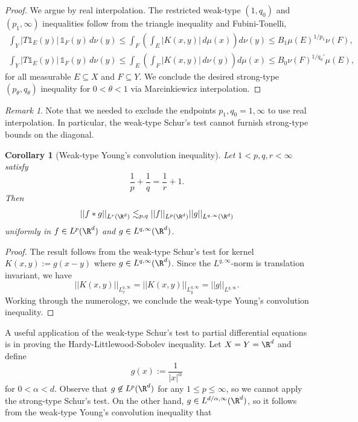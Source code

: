 \documentclass[reqno]{amsart}
\newtheorem{corollary}[theorem]{Corollary}
\theoremstyle{definition}
\theoremstyle{remark}
\newtheorem*{remark}{Remark}
\begin{document}
\begin{proof}
	We argue by real interpolation. The restricted weak-type $(1, q_0)$ and $(p_1, \infty)$ inequalities follow from the triangle inequality and Fubini-Tonelli, 
		\begin{align*}
			 \int_Y |T\mathbb 1_E (y)| \, \mathbb 1_F (y) \, d \nu(y) 
			 	\leq \int_F \left(\int_E |K(x, y)| \, d\mu(x) \right) d \nu(y) \leq B_1 \mu(E)^{1/p_1} \nu(F), \\
			  \int_Y |T\mathbb 1_E (y)| \, \mathbb 1_F (y) \, d \nu(y) 
			 	\leq  \int_E \left(\int_F |K(x, y)| \, d \nu(y) \right) d\mu(x)  \leq B_0 \nu(F)^{1/q_0'} \mu(E),
		\end{align*}	 
	for all measurable $E \subseteq X$ and $F \subseteq Y$. We conclude the desired strong-type $(p_\theta, q_\theta)$ inequality for $0 < \theta < 1$ via Marcinkiewicz interpolation. 	
\end{proof}

\begin{remark}
	Note that we needed to exclude the endpoints $p_1, q_0 = 1, \infty$ to use real interpolation. In particular, the weak-type Schur's test cannot furnish strong-type bounds on the diagonal. 
\end{remark}

\begin{corollary}[Weak-type Young's convolution inequality]
	Let $1 < p, q, r < \infty$ satisfy
		\[ \frac1p + \frac1q = \frac1r + 1. \]
	Then 
		\[ ||f * g||_{L^r (\R^d)} \lesssim_{p, q} ||f||_{L^p (\R^d)} ||g||_{L^{q, \infty} (\R^d)} \]	
	uniformly in $f \in L^p (\R^d)$ and $g \in L^{q, \infty} (\R^d)$.
\end{corollary}

\begin{proof}
	The result follows from the weak-type Schur's test for kernel $K(x, y) := g(x - y)$ where $g \in L^{q, \infty} (\R^d)$. Since the $L^{q, \infty}$-norm is translation invariant, we have 
		\[ ||K(x, y)||_{L^{q, \infty}_x} = ||K(x, y)||_{L^{q, \infty}_y} = ||g||_{L^{q, \infty}}. \]
	Working through the numerology, we conclude the weak-type Young's convolution inequality.	
\end{proof}

A useful application of the weak-type Schur's test to partial differential equations is in proving the Hardy-Littlewood-Sobolev inequality. Let $X = Y = \R^d$ and define
	\[ g(x) := \frac{1}{|x|^\alpha} \]
for $0 < \alpha < d$. Observe that $g \not\in L^p (\R^d)$ for any $1 \leq p \leq \infty$, so we cannot apply the strong-type Schur's test. On the other hand, $g \in L^{d/\alpha, \infty} (\R^d)$, so it follows from the weak-type Young's convolution inequality that
\end{document}
